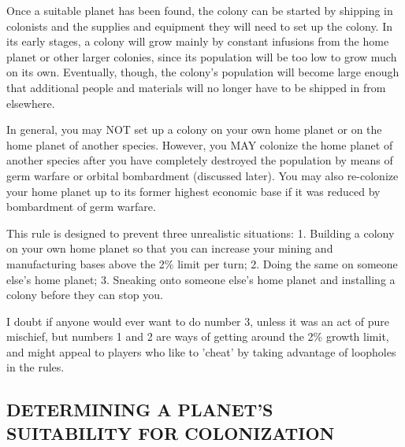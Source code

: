 \documentclass[10pt,titlepage]{article}
\begin{document}
Once a suitable planet has been found, the colony can be started by shipping in
colonists and the supplies and equipment they will need to set up the colony.
In its early stages, a colony will grow mainly by constant infusions from the
home planet or other larger colonies, since its population will be too low to
grow much on its own.  Eventually, though, the colony's population will become
large enough that additional people and materials will no longer have to be
shipped in from elsewhere.

\begin{importantnote}
	In general, you may NOT set up a colony on your own home planet
	or on the home planet of another species.  However, you MAY
	colonize the home planet of another species after you have
	completely destroyed the population by means of germ warfare or
	orbital bombardment (discussed later).  You may also re-colonize
	your home planet up to its former highest economic base if it
	was reduced by bombardment of germ warfare.
\end{importantnote}

This rule is designed to prevent three unrealistic situations:  1. Building
a colony on your own home planet so that you can increase your mining and
manufacturing bases above the 2\% limit per turn;  2. Doing the same on someone
else's home planet;  3. Sneaking onto someone else's home planet and installing
a colony before they can stop you.

I doubt if anyone would ever want to do number 3, unless it was an act of pure
mischief, but numbers 1 and 2 are ways of getting around the 2\% growth limit,
and might appeal to players who like to 'cheat' by taking advantage of
loopholes in the rules.


\subsection{DETERMINING A PLANET'S SUITABILITY FOR COLONIZATION}
\label{sec:determiningsuitability}
\end{document}

